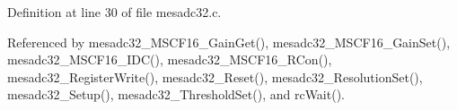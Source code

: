 Definition at line 30 of file mesadc32.c.

Referenced by mesadc32\_\-MSCF16\_\-GainGet(), mesadc32\_\-MSCF16\_\-GainSet(), mesadc32\_\-MSCF16\_\-IDC(), mesadc32\_\-MSCF16\_\-RCon(), mesadc32\_\-RegisterWrite(), mesadc32\_\-Reset(), mesadc32\_\-ResolutionSet(), mesadc32\_\-Setup(), mesadc32\_\-ThresholdSet(), and rcWait().